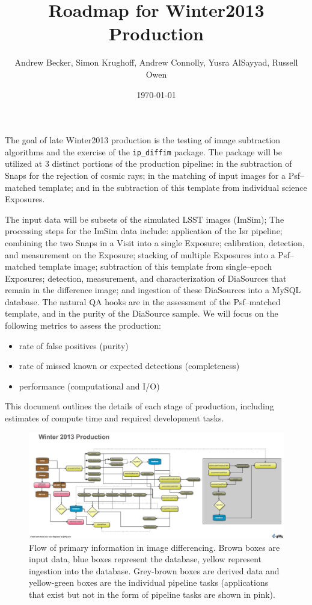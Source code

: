 \documentclass[prd, nofootinbib, floatfix, 11pt,tightenlines,times]{article}
\author{Andrew Becker, Simon Krughoff, Andrew Connolly, Yusra AlSayyad, Russell Owen}
\title{Roadmap for Winter2013 Production}
\date{\today}
\begin{document}
\maketitle

The goal of late Winter2013 production is the testing of image
subtraction algorithms and the exercise of the {\tt ip\_diffim}
package.  The package will be utilized at 3 distinct portions of the
production pipeline: in the subtraction of Snaps for the rejection of
cosmic rays; in the matching of input images for a Psf--matched
template; and in the subtraction of this template from individual
science Exposures.

The input data will be subsets of the simulated LSST images (ImSim);
The processing steps for the ImSim data include:
application of the Isr pipeline; combining the two Snaps in a Visit
into a single Exposure; calibration, detection, and measurement on the
Exposure; stacking of multiple Exposures into a Psf--matched template
image; subtraction of this template from single--epoch Exposures;
detection, measurement, and characterization of DiaSources that remain
in the difference image; and ingestion of these DiaSources into a
MySQL database.  The natural QA hooks are in the assessment of the
Psf--matched template, and in the purity of the DiaSource sample.  We
will focus on the following metrics to assess the production:
\begin{itemize}
\item rate of false positives (purity)
\item rate of missed known or expected detections (completeness)
\item performance (computational and I/O)
\end{itemize}
This document outlines the details of each stage of production, 
including estimates of compute time and required development tasks.

\clearpage
\tableofcontents
\clearpage


\begin{figure}
\includegraphics[width=\textwidth]{Figures/Winter_2013.png}
\caption{Flow of primary information in image differencing. Brown
  boxes are input data, blue boxes represent the database, yellow
  represent ingestion into the database. Grey-brown boxes are derived
  data and yellow-green boxes are the individual pipeline tasks (applications
  that exist but not in the form of pipeline tasks are shown in pink).}
\label{flow}
\end{figure}
\end{document}
